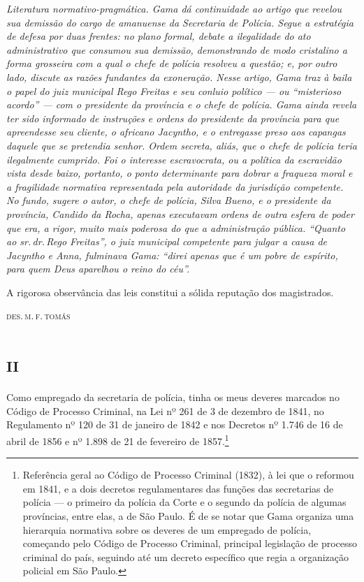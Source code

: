 \begin{didascalia}\itshape
Literatura normativo-pragmática. Gama dá continuidade ao artigo que
revelou sua demissão do cargo de amanuense da Secretaria de Polícia.
Segue a estratégia de defesa por duas frentes: no plano formal, debate a
ilegalidade do ato administrativo que consumou sua demissão,
demonstrando de modo cristalino a forma grosseira com a qual o chefe de
polícia resolveu a questão; e, por outro lado, discute as razões
fundantes da exoneração. Nesse artigo, Gama traz à baila o papel do juiz
municipal Rego Freitas e seu conluio político --- ou ``misterioso acordo''
--- com o presidente da província e o chefe de polícia. Gama ainda revela
ter sido informado de instruções e ordens do presidente da província
para que apreendesse seu cliente, o africano Jacyntho, e o entregasse
preso aos capangas daquele que se pretendia senhor. Ordem secreta,
aliás, que o chefe de polícia teria ilegalmente cumprido. Foi o
interesse escravocrata, ou a política da escravidão vista desde baixo,
portanto, o ponto determinante para dobrar a fraqueza moral e a
fragilidade normativa representada pela autoridade da jurisdição
competente. No fundo, sugere o autor, o chefe de polícia, Silva Bueno, e
o presidente da província, Candido da Rocha, apenas executavam ordens de
outra esfera de poder que era, a rigor, muito mais poderosa do que a
administração pública. ``Quanto ao sr.\,dr.\,Rego Freitas'', o juiz
municipal competente para julgar a causa de Jacyntho e Anna, fulminava
Gama: ``direi apenas que é um pobre de espírito, para quem Deus aparelhou
o reino do céu''.
\end{didascalia}

\pagebreak

\epigraph{A rigorosa observância das leis constitui a sólida reputação dos
magistrados.}{\textsc{des.\,m.\,f.\,tomás}\footnotemark}


\section{\textsc{ii}}

Como empregado da secretaria de polícia, tinha os meus deveres marcados
no Código de Processo Criminal, na Lei nº 261 de 3 de dezembro de 1841,
no Regulamento nº 120 de 31 de janeiro de 1842 e nos Decretos nº 1.746
de 16 de abril de 1856 e nº 1.898 de 21 de fevereiro de 1857.\footnote{
  Referência geral ao Código de Processo Criminal (1832), à lei que o
  reformou em 1841, e a dois decretos regulamentares das funções das
  secretarias de polícia --- o primeiro da polícia da Corte e o segundo
  da polícia de algumas províncias, entre elas, a de São Paulo. É de se
  notar que Gama organiza uma hierarquia normativa sobre os deveres de
  um empregado de polícia, começando pelo Código de Processo Criminal,
  principal legislação de processo criminal do país, seguindo até um
  decreto específico que regia a organização policial em São Paulo.}


